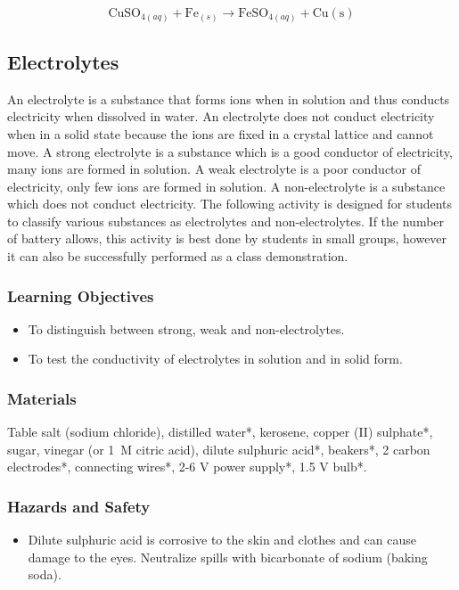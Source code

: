 $$ \mathrm{CuSO}_{4(aq)} + \mathrm{Fe}_{(s)} \longrightarrow \mathrm{FeSO}_{4(aq)} + \mathrm{Cu(s)} $$

\subsection{Electrolytes}

An electrolyte is a substance that forms ions when in solution and thus conducts electricity when dissolved in water. An electrolyte does not conduct electricity when in a solid state because the ions are fixed in a crystal lattice and cannot move.  A strong electrolyte is a substance which is a good conductor of electricity, many ions are formed in solution. A weak electrolyte is a poor conductor of electricity, only few ions are formed in solution. A non-electrolyte is a substance which does not conduct electricity. The following activity is designed for students to classify various substances as electrolytes and non-electrolytes. If the number of battery allows, this activity is best done by students in small groups, however it can also be successfully performed as a class demonstration.

\subsubsection*{Learning Objectives}
\begin{itemize}
\item{To distinguish between strong, weak and non-electrolytes.}
\item{To test the conductivity of electrolytes in solution and in solid form.}
\end{itemize}

\subsubsection*{Materials}
Table salt (sodium chloride), distilled water*, kerosene, copper (II) sulphate*, sugar, vinegar (or 1~M citric acid), dilute sulphuric acid*, beakers*, 2 carbon electrodes*, connecting wires*, 2-6 V power supply*, 1.5 V bulb*.

\subsubsection*{Hazards and Safety}
\begin{itemize}
\item{Dilute sulphuric acid is corrosive to the skin and clothes and can cause damage to the eyes. Neutralize spills with bicarbonate of sodium (baking soda).}
\end{itemize}

